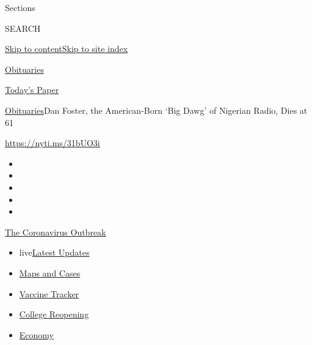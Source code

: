 Sections

SEARCH

\protect\hyperlink{site-content}{Skip to
content}\protect\hyperlink{site-index}{Skip to site index}

\href{https://www.nytimes.com/section/obituaries}{Obituaries}

\href{https://myaccount.nytimes.com/auth/login?response_type=cookie\&client_id=vi}{}

\href{https://www.nytimes.com/section/todayspaper}{Today's Paper}

\href{/section/obituaries}{Obituaries}\textbar{}Dan Foster, the
American-Born `Big Dawg' of Nigerian Radio, Dies at 61

\url{https://nyti.ms/31bUO3i}

\begin{itemize}
\item
\item
\item
\item
\item
\end{itemize}

\href{https://www.nytimes.com/news-event/coronavirus?action=click\&pgtype=Article\&state=default\&region=TOP_BANNER\&context=storylines_menu}{The
Coronavirus Outbreak}

\begin{itemize}
\tightlist
\item
  live\href{https://www.nytimes.com/2020/08/03/world/coronavirus-covid-19.html?action=click\&pgtype=Article\&state=default\&region=TOP_BANNER\&context=storylines_menu}{Latest
  Updates}
\item
  \href{https://www.nytimes.com/interactive/2020/us/coronavirus-us-cases.html?action=click\&pgtype=Article\&state=default\&region=TOP_BANNER\&context=storylines_menu}{Maps
  and Cases}
\item
  \href{https://www.nytimes.com/interactive/2020/science/coronavirus-vaccine-tracker.html?action=click\&pgtype=Article\&state=default\&region=TOP_BANNER\&context=storylines_menu}{Vaccine
  Tracker}
\item
  \href{https://www.nytimes.com/2020/08/02/us/covid-college-reopening.html?action=click\&pgtype=Article\&state=default\&region=TOP_BANNER\&context=storylines_menu}{College
  Reopening}
\item
  \href{https://www.nytimes.com/live/2020/08/03/business/stock-market-today-coronavirus?action=click\&pgtype=Article\&state=default\&region=TOP_BANNER\&context=storylines_menu}{Economy}
\end{itemize}

